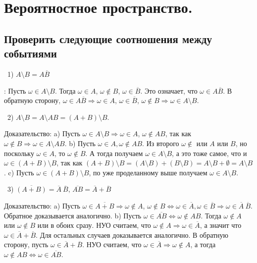 
\section{Вероятностное пространство.}

\subsection{Проверить следующие соотношения между событиями}

\noindent~1) $A \setminus B = A \overline{B}$

: Пусть $\omega \in A \setminus B$. Тогда $\omega \in A$, $\omega \not\in B$, $
\omega \in \overline{B}$. Это означает, что $\omega \in A\overline{B}$. 
В обратную сторону, $\omega \in A\overline{B} \Rightarrow \omega \in A$, $\omega \in 
\overline{B}$, $\omega \not\in B \Rightarrow \omega \in A \setminus B$.

\medskip
\noindent~2) $A \setminus B = A \setminus AB = \left( A + B \right)  \setminus B$.

\noindent Доказательство:
a) Пусть $\omega \in A \setminus B \Rightarrow \omega \in A$, $\omega \not\in AB$, так 
как $\omega \not\in B \Rightarrow \omega \in A \setminus AB$. 
b) Пусть $\omega \in A, \omega \not\in
AB$. Из второго $\omega \not\in$ или $A$ или $B$, но поскольку $\omega \in A$, то $\omega \not\in
B$. А тогда получаем $\omega \in A \setminus B$, а это тоже самое, что и $\omega \in (A + B) \setminus
B$, так как $(A + B) \setminus B = (A \setminus B) + (B \setminus B) = A \setminus B + \emptyset = 
A \setminus B$. 
c) Пусть $\omega \in (A + B) \setminus B$, по уже проделанному выше получаем $\omega
\in A \setminus B$.

\medskip
\noindent~3) $\overline{\left( A + B \right) } = \overline{A}~\overline{B}$, $\overline{AB} = \overline{A} + 
\overline{B}$

\noindent Доказательство: a) Пусть $\omega \in \overline{A + B} \Rightarrow \omega \not\in A$, $\omega \not\in B 
\Leftrightarrow \omega \in \overline{A}, \omega \in \overline{B} \Rightarrow \omega \in \overline{A}~
\overline{B}$. Обратное доказывается аналогично. b) Пусть $\omega \in \overline{AB} \Leftrightarrow 
\omega \not\in AB$. Тогда $\omega \not\in A$ или $\omega \not\in B$ или в обоих сразу. НУО считаем, что
$\omega \not\in A \Rightarrow \omega \in \overline{A}$, а значит что $\omega \in \overline{A} + 
\overline{B}$. Для остальных случаев доказывается аналогично. В обратную сторону, пусть $\omega \in
\overline{A} + \overline{B}$. НУО считаем, что $\omega \in \overline{A} \Rightarrow \omega \not\in A$, 
а тогда $\omega \not\in A B \Leftrightarrow \omega \in \overline{AB}$.

